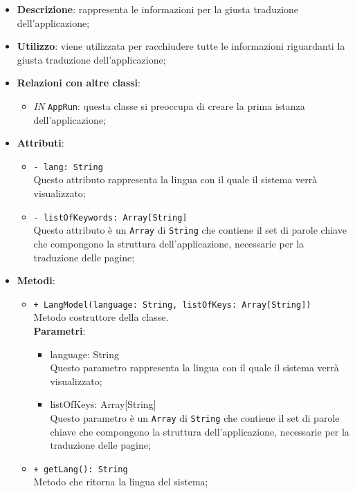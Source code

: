 		\begin{itemize}
			\item \textbf{Descrizione}: rappresenta le informazioni per la giusta traduzione dell'applicazione;
			\item \textbf{Utilizzo}: viene utilizzata per racchiudere tutte le informazioni riguardanti la giusta traduzione dell'applicazione;
			\item \textbf{Relazioni con altre classi}: 
			\begin{itemize}
				\item \textit{IN} \texttt{AppRun}: questa classe si preoccupa di creare la prima istanza dell'applicazione;
			\end{itemize}
			\item \textbf{Attributi}: 
			\begin{itemize}
				\item \texttt{- lang: String} \\
				Questo attributo rappresenta la lingua con il quale il sistema verrà visualizzato;  
				\item \texttt{- listOfKeywords: Array[String]} \\
				Questo attributo è un \texttt{Array} di \texttt{String} che contiene il set di parole chiave che compongono la struttura dell'applicazione, necessarie per la traduzione delle pagine; 
			\end{itemize}
			\item \textbf{Metodi}: 
			\begin{itemize}
				\item \texttt{+ LangModel(language: String, listOfKeys: Array[String])} \\
				Metodo costruttore della classe.\\
				\textbf{Parametri}:
				\begin{itemize}
					\item {language: String}\\
					Questo parametro rappresenta la lingua con il quale il sistema verrà visualizzato;
					\item {listOfKeys: Array[String]}\\
					Questo parametro è un \texttt{Array} di \texttt{String} che contiene il set di parole chiave che compongono la struttura dell'applicazione, necessarie per la traduzione delle pagine; 
				\end{itemize}
				
				\item \texttt{+ getLang(): String} \\
				Metodo che ritorna la lingua del sistema;
				

\end{itemize}
\end{itemize}

